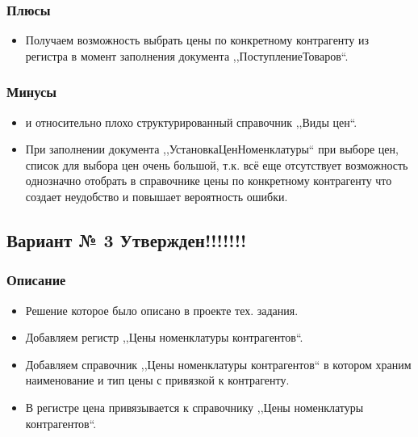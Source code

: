 \subsubsection{Плюсы}
\begin{itemize}	
\item Получаем возможность выбрать цены по конкретному контрагенту из регистра в момент заполнения документа ,,ПоступлениеТоваров``.
\end{itemize}
\subsubsection{Минусы}
\begin{itemize}	
\item {} и относительно плохо структурированный справочник ,,Виды цен``.
\item При заполнении документа ,,УстановкаЦенНоменклатуры`` при выборе цен, список для выбора цен очень большой, т.к. всё еще отсутствует возможность однозначно отобрать в справочнике цены по конкретному контрагенту что создает неудобство и повышает вероятность ошибки.
\end{itemize}


\subsection{Вариант № 3 Утвержден!!!!!!!}
\subsubsection{Описание}
\begin{itemize}	
\item Решение которое было описано в проекте тех. задания.
\item Добавляем регистр ,,Цены номенклатуры контрагентов``.
\item Добавляем справочник ,,Цены номенклатуры контрагентов`` в котором храним наименование и тип цены с привязкой к контрагенту.
\item В регистре цена привязывается к справочнику ,,Цены номенклатуры контрагентов``.
\end{itemize}
